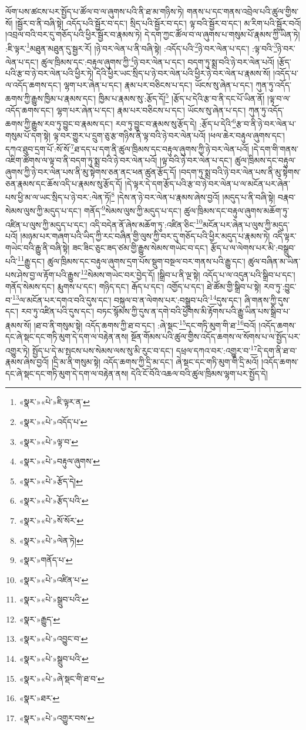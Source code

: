 ལོག་པས་ཚངས་པར་སྤྱོད་པ་ཚོལ་བ་ལ་ཞུགས་པའི་ནི་ཐ་མ་གཉིས་ཏེ། གནས་པ་དང་གནས་འབྲེལ་པའི་ཚུལ་གྱིས་སོ། །སྦྱོར་བ་ནི་བཞི་སྟེ། འདོད་པའི་སྦྱོར་བ་དང་། སྲིད་པའི་སྦྱོར་བ་དང་། ལྟ་བའི་སྦྱོར་བ་དང་། མ་རིག་པའི་སྦྱོར་བའོ། །འབྲལ་བའི་བར་དུ་གཅོད་པའི་ཕྱིར་སྦྱོར་བ་རྣམས་ཏེ། དེ་དག་ཀྱང་ཚོལ་བ་ལ་ཞུགས་པ་གསུམ་པོ་རྣམས་ཀྱི་ཡིན་ཏེ། :ཇི་ལྟར་\footnote{«སྣར་»«པེ་»ཇི་ལྟར་ན་}མཐུན་མཐུན་དུ་སྦྱར་རོ། །ཉེ་བར་ལེན་པ་ནི་བཞི་སྟེ། :འདོད་པའི་\footnote{«སྣར་»«པེ་»འདོད་པ་}ཉེ་བར་ལེན་པ་དང་། :ལྟ་བའི་\footnote{«སྣར་»«པེ་»ལྟ་བ་}ཉེ་བར་ལེན་པ་དང་། ཚུལ་ཁྲིམས་དང་:བརྟུལ་ཞུགས་ཀྱི་\footnote{«སྣར་»«པེ་»བརྟུལ་ཞུགས་}ཉེ་བར་ལེན་པ་དང་། བདག་ཏུ་སྨྲ་བའི་ཉེ་བར་ལེན་པའོ། །རྩོད་པའི་རྩ་བ་ཉེ་བར་ལེན་པའི་ཕྱིར་ཏེ། དེའི་ཕྱིར་ཡང་སྲིད་པ་ཉེ་བར་ལེན་པའི་ཕྱིར་ཉེ་བར་ལེན་པ་རྣམས་སོ། །འདོད་པ་ལ་འདོད་ཆགས་དང་། ལྷག་པར་ཞེན་པ་དང་། རྣམ་པར་བཅིངས་པ་དང་། ཡོངས་སུ་ཞེན་པ་དང་། ཀུན་ཏུ་འདོད་ཆགས་ཀྱི་རྒྱུས་ཁྱིམ་པ་རྣམས་དང་། ཁྱིམ་པ་རྣམས་སུ་:རྩོད་དོ།\footnote{«སྣར་»«པེ་»རྩོད་དེ།} །རྩོད་པ་དེའི་རྩ་བ་ནི་དང་པོ་ཡིན་ནོ། །ལྟ་བ་ལ་འདོད་ཆགས་དང་། ལྷག་པར་ཞེན་པ་དང་། རྣམ་པར་བཅིངས་པ་དང་། ཡོངས་སུ་ཞེན་པ་དང་། ཀུན་ཏུ་འདོད་ཆགས་ཀྱི་རྒྱུས་རབ་ཏུ་བྱུང་བ་རྣམས་དང་། རབ་ཏུ་བྱུང་བ་རྣམས་སུ་རྩོད་དེ། :རྩོད་པ་དེའི་\footnote{«སྣར་»«པེ་»རྩོད་པའི་}རྩ་བ་ནི་ཉེ་བར་ལེན་པ་གསུམ་པོ་དག་སྟེ། ལྟ་བར་གྱུར་པ་དྲུག་ཅུ་རྩ་གཉིས་ནི་ལྟ་བའི་ཉེ་བར་ལེན་པའོ། །ཕལ་ཆེར་བརྟུལ་ཞུགས་དང་། དཀའ་ཐུབ་དྲག་པོ་:སོ་སོ་\footnote{«སྣར་»«པེ་»སོ་སོར་}ཐ་དད་པ་དག་ནི་ཚུལ་ཁྲིམས་དང་བརྟུལ་ཞུགས་ཀྱི་ཉེ་བར་ལེན་པའོ། །དེ་དག་གི་གནས་འཇིག་ཚོགས་ལ་ལྟ་བ་ནི་བདག་ཏུ་སྨྲ་བའི་ཉེ་བར་ལེན་པའོ། །ལྟ་བའི་ཉེ་བར་ལེན་པ་དང་། ཚུལ་ཁྲིམས་དང་བརྟུལ་ཞུགས་ཀྱི་ཉེ་བར་ལེན་པས་ནི་མུ་སྟེགས་ཅན་ནང་ཕན་ཚུན་རྩོད་དོ། །བདག་ཏུ་སྨྲ་བའི་ཉེ་བར་ལེན་པས་ནི་མུ་སྟེགས་ཅན་རྣམས་དང་ཆོས་འདི་པ་རྣམས་སུ་རྩོད་དོ། །དེ་ལྟར་དེ་དག་རྩོད་པའི་རྩ་བ་ཉེ་བར་ལེན་པ་ལ་མངོན་པར་ཞེན་པས་ཕྱི་མ་ལ་ཡང་སྲིད་པ་ཉེ་བར་:ལེན་ཏོ།\footnote{«སྣར་»«པེ་»ལེན་ཏེ།} །དེས་ན་ཉེ་བར་ལེན་པ་རྣམས་ཞེས་བྱའོ། །མདུད་པ་ནི་བཞི་སྟེ། བརྣབ་སེམས་ལུས་ཀྱི་མདུད་པ་དང་། གནོད་\footnote{«སྣར་»གནོད་པ་}སེམས་ལུས་ཀྱི་མདུད་པ་དང་། ཚུལ་ཁྲིམས་དང་བརྟུལ་ཞུགས་མཆོག་ཏུ་འཛིན་པ་ལུས་ཀྱི་མདུད་པ་དང་། འདི་བདེན་ནོ་ཞེས་མཆོག་ཏུ་:འཛིན་ཅིང་\footnote{«སྣར་»«པེ་»འཛིན་པ་}མངོན་པར་ཞེན་པ་ལུས་ཀྱི་མདུད་པའོ། །མཉམ་པར་གཞག་པའི་ཡིད་ཀྱི་རང་བཞིན་གྱི་ལུས་ཀྱི་བར་དུ་གཅོད་པའི་ཕྱིར་མདུད་པ་རྣམས་ཏེ། འདི་ལྟར་གཡེང་བའི་རྒྱུ་ནི་བཞི་སྟེ། ཟང་ཟིང་ཅུང་ཟད་ཙམ་གྱི་རྒྱུས་སེམས་གཡེང་བ་དང་། རྩོད་པ་ལ་ལེགས་པར་མི་:བསྒྲུབ་པའི་\footnote{«སྣར་»«པེ་»སྒྲུབ་པའི་}རྒྱུ་དང་། ཚུལ་ཁྲིམས་དང་བརྟུལ་ཞུགས་དྲག་པོས་སྡུག་བསྔལ་བར་གནས་པའི་རྒྱུ་དང་། ཚུལ་བཞིན་མ་ཡིན་པས་ཤེས་བྱ་ལ་རྟོག་པའི་རྒྱུས་\footnote{«སྣར་»རྒྱུད་}སེམས་གཡེང་བར་བྱེད་དོ། །སྒྲིབ་པ་ནི་ལྔ་སྟེ། འདོད་པ་ལ་འདུན་པའི་སྒྲིབ་པ་དང་། གནོད་སེམས་དང་། རྨུགས་པ་དང་། གཉིད་དང་། རྒོད་པ་དང་། འགྱོད་པ་དང་། ཐེ་ཚོམ་གྱི་སྒྲིབ་པ་སྟེ། རབ་ཏུ་:བྱུང་བ་\footnote{«སྣར་»«པེ་»འབྱུང་བ་}ལ་མངོན་པར་དགའ་བའི་དུས་དང་། བསྐུལ་བ་ན་ལེགས་པར་:བསྒྲུབ་པའི་\footnote{«སྣར་»«པེ་»སྒྲུབ་པའི་}དུས་དང་། ཞི་གནས་ཀྱི་དུས་དང་། རབ་ཏུ་འཛིན་པའི་དུས་དང་། བཏང་སྙོམས་ཀྱི་དུས་ན་དགེ་བའི་ཕྱོགས་མི་རྟོགས་པའི་རྒྱུ་ཡིན་པས་སྒྲིབ་པ་རྣམས་སོ། །ཐ་བ་ནི་གསུམ་སྟེ། འདོད་ཆགས་ཀྱི་ཐ་བ་དང་། :ཞེ་སྡང་\footnote{«སྣར་»«པེ་»ཞེ་སྡང་གི་ཐ་བ་}དང་གཏི་མུག་གི་ཐ་\footnote{«སྣར་»ཐར་}བའོ། །འདོད་ཆགས་དང་ཞེ་སྡང་དང་གཏི་མུག་དེ་དག་ལ་བརྟེན་ནས། སྔོན་གོམས་པའི་ཚུལ་གྱིས་འདོད་ཆགས་ལ་སོགས་པ་ལ་སྤྱོད་པར་འགྱུར་ཏེ། སྤྱོད་པ་དེ་མ་སྤངས་པས་སེམས་ལས་སུ་མི་རུང་བ་དང་། དཕྲལ་དཀའ་བར་:འགྱུར་བ་\footnote{«སྣར་»«པེ་»འགྱུར་བས་}དེ་དག་ནི་ཐ་བ་རྣམས་ཞེས་བྱའོ། །དྲི་མ་ནི་གསུམ་སྟེ། འདོད་ཆགས་ཀྱི་དྲི་མ་དང་། ཞེ་སྡང་དང་གཏི་མུག་གི་དྲི་མའོ། །འདོད་ཆགས་དང་ཞེ་སྡང་དང་གཏི་མུག་དེ་དག་ལ་བརྟེན་ནས། དེའི་ངོ་བོའི་འཆལ་བའི་ཚུལ་ཁྲིམས་ལྷག་པར་སྤྱོད་དེ། 